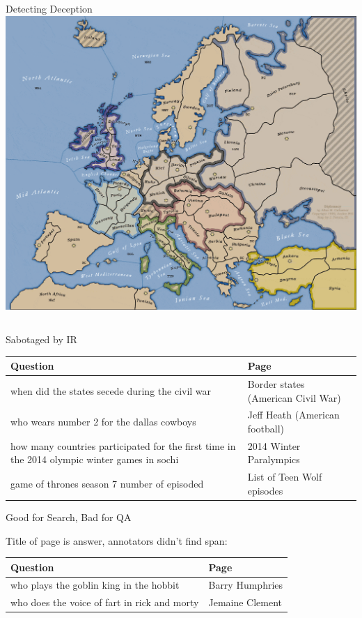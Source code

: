 \documentclass[xcolor=dvipsnames,xcolor=table]{beamer}
\begin{document}
{\begin{columns}
    \begin{block}{Detecting Deception}
    \centering
        \includegraphics[width=0.4\linewidth]{general_figures/diplomacy} \\
        \cite{niculae-15,peskov-20}
    \end{block}




\end{columns}

}

\begin{frame}{Sabotaged by IR}

  \begin{small}
  \begin{tabular}{p{7cm}p{3cm}}
    \toprule
    Question & Page \\
    \hline
 when did the states secede during the civil war &  Border states (American Civil War) \\
 who wears number 2 for the dallas cowboys &  Jeff Heath (American football) \\
 how many countries participated for the first time in the 2014 olympic winter games in sochi & 2014 Winter Paralympics \\
 game of thrones season 7 number of episoded &  List of Teen Wolf episodes \\
 \bottomrule
  \end{tabular}
  \end{small}

\end{frame}

\begin{frame}{Good for Search, Bad for QA}

  Title of page is answer, annotators didn't find span:
  \begin{tabular}{p{7cm}p{3cm}}
    \toprule
    Question & Page \\
    \hline
  who plays the goblin king in the hobbit &  Barry Humphries  \\
  who does the voice of fart in rick and morty & Jemaine Clement   \\
 \bottomrule
  \end{tabular}
\end{frame}
\end{document}
